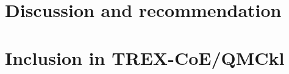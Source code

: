 \documentclass[11pt]{article}
\numberwithin{figure}{section}
\numberwithin{table}{section}
\begin{document}
		
	\section{Discussion and recommendation}
		
	\section{Inclusion in TREX-CoE/QMCkl}

\clearpage
{}


		
\end{document}
